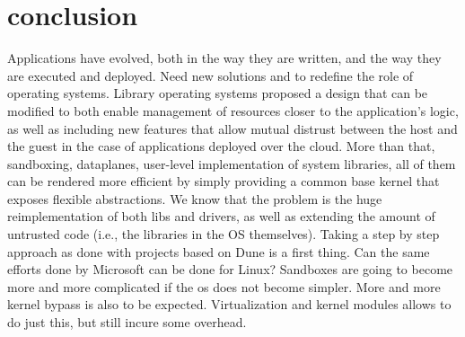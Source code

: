 \section{conclusion}
Applications have evolved, both in the way they are written, and the way they are executed and deployed.
Need new solutions and to redefine the role of operating systems.
Library operating systems proposed a design that can be modified to both enable management of resources closer to the application's logic, as well as including new features that allow mutual distrust between the host and the guest in the case of applications deployed over the cloud.
More than that, sandboxing, dataplanes, user-level implementation of system libraries, all of them can be rendered more efficient by simply providing a common base kernel that exposes flexible abstractions.
We know that the problem is the huge reimplementation of both libs and drivers, as well as extending the amount of untrusted code (i.e., the libraries in the OS themselves).
Taking a step by step approach as done with projects based on Dune is a first thing.
Can the same efforts done by Microsoft can be done for Linux? 
Sandboxes are going to become more and more complicated if the os does not become simpler.
More and more kernel bypass is also to be expected.
Virtualization and kernel modules allows to do just this, but still incure some overhead.